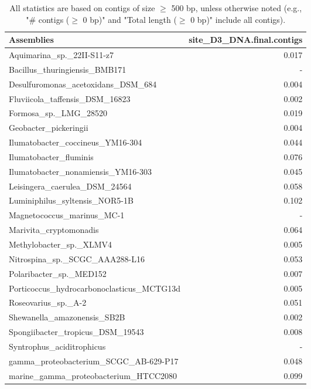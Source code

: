 \documentclass[12pt,a4paper]{article}
\begin{document}
\begin{table}[ht]
\begin{center}
\caption{All statistics are based on contigs of size $\geq$ 500 bp, unless otherwise noted (e.g., "\# contigs ($\geq$ 0 bp)" and "Total length ($\geq$ 0 bp)" include all contigs).}
\begin{tabular}{|l*{1}{|r}|}
\hline
Assemblies & site\_D3\_DNA.final.contigs \\ \hline
Aquimarina\_sp.\_22II-S11-z7 & 0.017 \\ \hline
Bacillus\_thuringiensis\_BMB171 & - \\ \hline
Desulfuromonas\_acetoxidans\_DSM\_684 & 0.004 \\ \hline
Fluviicola\_taffensis\_DSM\_16823 & 0.002 \\ \hline
Formosa\_sp.\_LMG\_28520 & 0.019 \\ \hline
Geobacter\_pickeringii & 0.004 \\ \hline
Ilumatobacter\_coccineus\_YM16-304 & 0.044 \\ \hline
Ilumatobacter\_fluminis & 0.076 \\ \hline
Ilumatobacter\_nonamiensis\_YM16-303 & 0.045 \\ \hline
Leisingera\_caerulea\_DSM\_24564 & 0.058 \\ \hline
Luminiphilus\_syltensis\_NOR5-1B & 0.102 \\ \hline
Magnetococcus\_marinus\_MC-1 & - \\ \hline
Marivita\_cryptomonadis & 0.064 \\ \hline
Methylobacter\_sp.\_XLMV4 & 0.005 \\ \hline
Nitrospina\_sp.\_SCGC\_AAA288-L16 & 0.053 \\ \hline
Polaribacter\_sp.\_MED152 & 0.007 \\ \hline
Porticoccus\_hydrocarbonoclasticus\_MCTG13d & 0.005 \\ \hline
Roseovarius\_sp.\_A-2 & 0.051 \\ \hline
Shewanella\_amazonensis\_SB2B & 0.002 \\ \hline
Spongiibacter\_tropicus\_DSM\_19543 & 0.008 \\ \hline
Syntrophus\_aciditrophicus & - \\ \hline
gamma\_proteobacterium\_SCGC\_AB-629-P17 & 0.048 \\ \hline
marine\_gamma\_proteobacterium\_HTCC2080 & 0.099 \\ \hline
\end{tabular}
\end{center}
\end{table}
\end{document}
